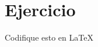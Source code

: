 \section{Ejercicio}

\begin{frame}
	\begin{block}{Codifique esto en \LaTeX}\end{block}

	\pause

	\begin{solution}
		\inputminted[fontsize=\tiny,frame=single]{latex}{solution1.tex}
	\end{solution}
\end{frame}
